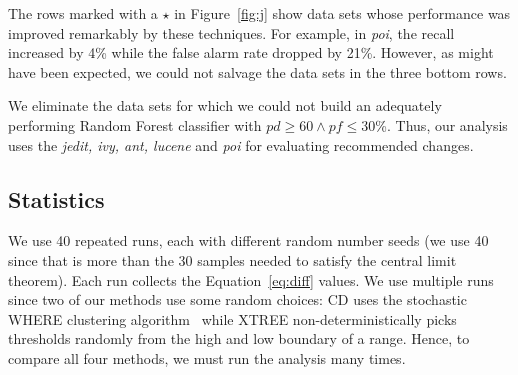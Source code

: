 \documentclass[twocolumn,5p]{elsarticle}
\newcommand{\bi}{\begin{itemize}[leftmargin=0.4cm]}
\newcommand{\ei}{\end{itemize}}
\newcommand{\fig}[1]{Figure~\ref{fig:#1}}
\newcommand{\eq}[1]{Equation~\ref{eq:#1}}
\theoremstyle{break}
\begin{document}
\begin{itemize}
		The rows \colorbox{celadon}{marked with a $\star$} in \fig{j} show data sets whose performance was improved remarkably by these techniques. For example, in {\em poi}, the recall increased by 4\% while the false alarm rate dropped by 21\%. However, as might have been expected, we could not salvage the data sets in the  three bottom rows.
		
		We eliminate the data sets for which we could not build an adequately performing Random Forest classifier with $\mathit{pd}\ge 60 \wedge \mathit{pf} \le 30$\%. Thus, our analysis uses the {\em jedit, ivy, ant, lucene} and {\em poi} for evaluating recommended changes.
		
		
		
%		
		
		\subsection{Statistics}
		
		
		We use 40 repeated runs, each with different random number seeds (we use 40 since that is  more than the 30 samples  needed to satisfy the central limit theorem). Each run collects the \eq{diff} values.
		We use multiple runs since two of our methods use some random choices: CD uses the  stochastic WHERE clustering algorithm~\cite{localvsglobal}
		while XTREE non-deterministically picks thresholds randomly from
		the high and low boundary of a range. 
		Hence, to compare all
		four methods, we must run the analysis many times. 
		

\end{itemize}
\end{document}
